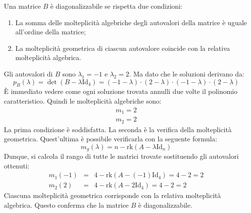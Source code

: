 \documentclass[a4paper]{article}
\begin{document}
	\noindent
	Una matrice $B$ è diagonalizzabile se rispetta due condizioni:
	\begin{enumerate}
		\item La somma delle molteplicità algebriche degli autovalori della matrice è uguale all'ordine della matrice;
		\item La molteplicità geometrica di ciascun autovalore coincide con la relativa molteplicità algebrica.
	\end{enumerate}
	Gli autovalori di $B$ sono $\lambda_{1}=-1$ e $\lambda_{2} = 2$. Ma dato che le soluzioni derivano da:
	\begin{equation*}
		p_{B}\left(\lambda\right) = \det\left(B - \lambda \mathrm{Id}_{4}\right) = \left(-1-\lambda\right) \cdot \left(2-\lambda\right) \cdot \left(-1-\lambda\right) \cdot \left(2-\lambda\right)
	\end{equation*}
	È immediato vedere come ogni soluzione trovata annulli due volte il polinomio caratteristico. Quindi le molteplicità algebriche sono:
	\begin{gather*}
		m_{1} = 2 \\
		m_{2} = 2
	\end{gather*}
	La prima condizione è soddisfatta. La seconda è la verifica della molteplicità geometrica. Quest'ultima è possibile verificarla con la seguente formula:
	\begin{equation*}
		m_{g}\left(\lambda\right) = n - \mathrm{rk}\left(A - \lambda\mathrm{Id}_{n}\right)
	\end{equation*}
	Dunque, si calcola il rango di tutte le matrici trovate sostituendo gli autovalori ottenuti:
	\begin{equation*}
		\begin{array}{lll}
			m_{1}\left(-1\right) &=& 4 - \mathrm{rk}\left(A - \left(-1\right)\mathrm{Id}_{4}\right) = 4 - 2 = 2 \\
			m_{2}\left( 2\right) &=& 4 - \mathrm{rk}\left(A - 2\mathrm{Id}_{4}\right) = 4 - 2 = 2
		\end{array}
	\end{equation*}
	Ciascuna molteplicità geometrica corrisponde con la relativa molteplicità algebrica. Questo conferma che la matrice $B$ è diagonalizzabile.\newline
\end{document}
